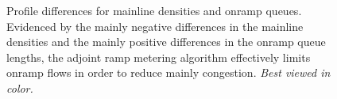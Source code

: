 							\begin{figure}[t]
								\hfill{}
																
								\caption{Profile differences for mainline densities and onramp queues. Evidenced
									by the mainly negative differences in the mainline densities and the
									mainly positive differences in the onramp queue lengths, the adjoint
									ramp metering algorithm effectively limits onramp flows in order to
									reduce mainly congestion. \textit{Best viewed in color.}\label{fig:long-sim}}
							\end{figure}
														
